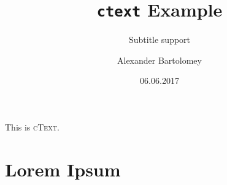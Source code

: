 \documentclass{htext}
\title{\texttt{ctext} Example}
\subtitle{Subtitle support}
\author{Alexander Bartolomey}
\date{06.06.2017}
\begin{document}
\maketitle
This is \textsc{cText}.
\section{Lorem Ipsum}
\lipsum[1-14]
\end{document}

